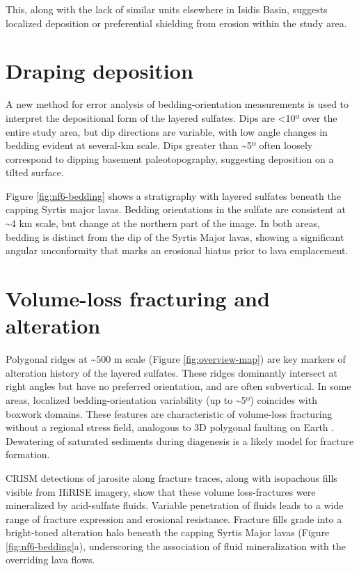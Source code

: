\begin{multicols}{2}

\small
\noindent{}This, along with the lack of similar units elsewhere in
Isidis Basin, suggests localized deposition or preferential shielding
from erosion within the study area.

\section{Draping deposition}\label{draping-deposition}

A new method for error analysis of bedding-orientation measurements
\autocite{Quinn2017MethodLPSC} is used to interpret the depositional
form of the layered sulfates. Dips are \textless{}10º over the entire
study area, but dip directions are variable, with low angle changes in
bedding evident at several-km scale. Dips greater than
\textasciitilde{}5º often loosely correspond to dipping basement
paleotopography, suggesting deposition on a tilted surface.

Figure \ref{fig:nf6-bedding} shows a stratigraphy with layered sulfates
beneath the capping Syrtis major lavas. Bedding orientations in the
sulfate are consistent at \textasciitilde{}4 km scale, but change at the
northern part of the image. In both areas, bedding is distinct from the
dip of the Syrtis Major lavas, showing a significant angular
unconformity that marks an erosional hiatus prior to lava emplacement.

\section{Volume-loss fracturing and
alteration}\label{volume-loss-fracturing-and-alteration}

Polygonal ridges at \textasciitilde{}500 m scale (Figure
\ref{fig:overview-map}) are key markers of alteration history of the
layered sulfates. These ridges dominantly intersect at right angles but
have no preferred orientation, and are often subvertical. In some areas,
localized bedding-orientation variability (up to \textasciitilde{}5º)
coincides with boxwork domains. These features are characteristic of
volume-loss fracturing without a regional stress field, analogous to 3D
polygonal faulting on Earth \autocite{Goulty2008}. Dewatering of
saturated sediments during diagenesis is a likely model for fracture
formation.

CRISM detections of jarosite along fracture traces, along with
isopachous fills visible from HiRISE imagery, show that these volume
loss-fractures were mineralized by acid-sulfate fluids. Variable
penetration of fluids leads to a wide range of fracture expression and
erosional resistance. Fracture fills grade into a bright-toned
alteration halo beneath the capping Syrtis Major lavas (Figure
\ref{fig:nf6-bedding}a), underscoring the association of fluid
mineralization with the overriding lava flows.


\end{multicols}
